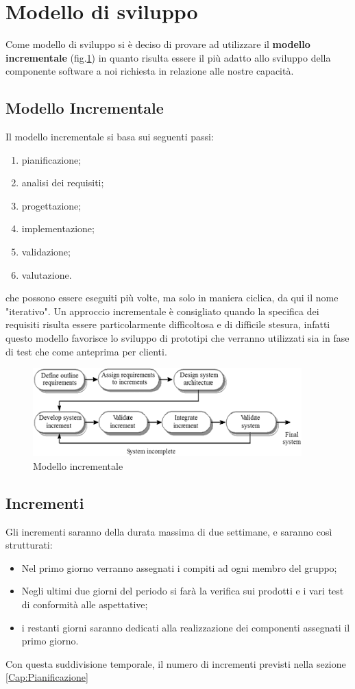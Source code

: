 \section{Modello di sviluppo}
	Come modello di sviluppo si è deciso di provare ad utilizzare il \textbf{modello incrementale} (fig.\ref{fig::Model}) in quanto risulta essere il più adatto allo sviluppo della componente software a noi richiesta in relazione alle nostre capacità. 
	
	\subsection{Modello Incrementale}
		Il modello incrementale si basa sui seguenti passi:
		\begin{enumerate}
			\item pianificazione;
			\item analisi dei requisiti\pedice;
			\item progettazione;
			\item implementazione;
			\item validazione;
			\item valutazione.
		\end{enumerate}
		che possono essere eseguiti più volte, ma solo in maniera ciclica, da qui il nome "iterativo". Un approccio incrementale è consigliato quando la specifica dei requisiti risulta essere particolarmente difficoltosa e di difficile stesura, infatti questo modello favorisce lo sviluppo di prototipi che verranno utilizzati sia in fase di test che come anteprima per clienti.

		\begin{figure}[!htpb]
			\centering
		    \includegraphics{IterativeModel.png}
			\caption{Modello incrementale}
			\label{fig::Model}
		\end{figure}

    \subsection{Incrementi}
        Gli incrementi saranno della durata massima di due settimane, e saranno così strutturati:
        \begin{itemize}
            \item Nel primo giorno verranno assegnati i compiti ad ogni membro del gruppo;
            \item Negli ultimi due giorni del periodo si farà la verifica sui prodotti e i vari test di conformità alle aspettative;
            \item i restanti giorni saranno dedicati alla realizzazione dei componenti assegnati il primo giorno.
        \end{itemize}
        Con questa suddivisione temporale, il numero di incrementi previsti nella sezione \ref{Cap:Pianificazione}
